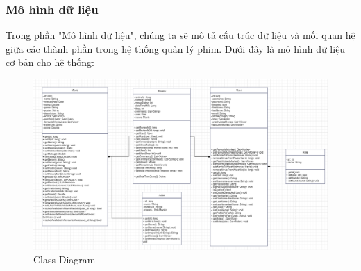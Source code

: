 \documentclass[12pt]{article}
\begin{document}
\subsubsection{Mô hình dữ liệu}
Trong phần "Mô hình dữ liệu", chúng ta sẽ mô tả cấu trúc dữ liệu và mối quan hệ giữa các thành phần trong hệ thống quản lý phim. Dưới đây là mô hình dữ liệu cơ bản cho hệ thống:
\begin{figure}[H]
    \centering
    \includegraphics[scale=0.35]{Figs/classDiagram.png}
    \caption{Class Diagram}
\end{figure}
\end{document}

